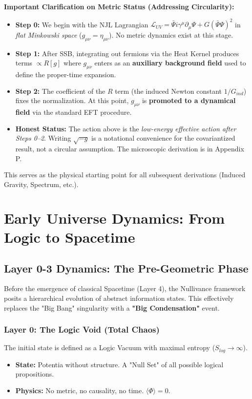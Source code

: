 \documentclass[a4paper,12pt]{article}
\begin{document}
\textbf{Important Clarification on Metric Status (Addressing Circularity):}
\begin{itemize}
    \item \textbf{Step 0:} We begin with the NJL Lagrangian $\mathcal{L}_{UV} = \bar{\Psi} i \gamma^\mu \partial_\mu \Psi + G(\bar{\Psi}\Psi)^2$ in \emph{flat Minkowski space} ($g_{\mu\nu} = \eta_{\mu\nu}$). No metric dynamics exist at this stage.
    \item \textbf{Step 1:} After SSB, integrating out fermions via the Heat Kernel produces terms $\propto R[g]$ where $g_{\mu\nu}$ enters as an \textbf{auxiliary background field} used to define the proper-time expansion.
    \item \textbf{Step 2:} The coefficient of the $R$ term (the induced Newton constant $1/G_{ind}$) fixes the normalization. At this point, $g_{\mu\nu}$ is \textbf{promoted to a dynamical field} via the standard EFT procedure.
    \item \textbf{Honest Status:} The action above is the \emph{low-energy effective action after Steps 0--2}. Writing $\sqrt{-g}$ is a notational convenience for the covariantized result, not a circular assumption. The microscopic derivation is in Appendix P.
\end{itemize}
This serves as the physical starting point for all subsequent derivations (Induced Gravity, Spectrum, etc.).
\section{Early Universe Dynamics: From Logic to Spacetime}

\subsection{Layer 0-3 Dynamics: The Pre-Geometric Phase}

Before the emergence of classical Spacetime (Layer 4), the Nullivance framework posits a hierarchical evolution of abstract information states. This effectively replaces the "Big Bang" singularity with a \textbf{"Big Condensation"} event.

\subsubsection{Layer 0: The Logic Void (Total Chaos)}
The initial state is defined as a Logic Vacuum with maximal entropy ($S_{log} \to \infty$).
\begin{itemize}
    \item \textbf{State:} Potentia without structure. A "Null Set" of all possible logical propositions.
    \item \textbf{Physics:} No metric, no causality, no time. $\langle \Phi \rangle = 0$.
\end{itemize}
\end{document}
